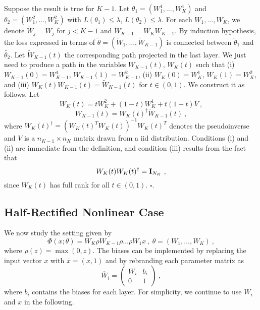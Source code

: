 Suppose the result is true for $K-1$. Let $\theta_1 = (W_1^1, \dots, W^1_K)$ and 
 $\theta_2 = (W_1^2, \dots, W^2_K)$ with $L(\theta_1) \leq \lambda$, $L(\theta_2) \leq \lambda$.
For each $W_1, \dots, W_K$, we denote $\tilde{W}_j = W_j$ for $j < K-1$ and
$\tilde{W}_{K-1} = W_K W_{K-1}$. By induction hypothesis, the 
loss expressed in terms of $\tilde{\theta} = (\tilde{W}_1, \dots, \tilde{W}_{K-1})$ is connected 
between $\tilde{\theta}_1$ and $\tilde{\theta_2}$. Let $\tilde{W}_{K-1}(t)$ the corresponding 
path projected in the last layer. We just need to produce a path in the variables $W_{K-1}(t)$, $W_K(t)$ 
such that (i) $W_{K-1}(0) = W_{K-1}^1$, $W_{K-1}(1) = W_{K-1}^2$, 
(ii) $W_{K}(0) = W_{K}^1$, $W_{K}(1) = W_{K}^2$, and 
(iii) $W_{K}(t) W_{K-1}(t) = \tilde{W}_{K-1}(t)$ for $t \in (0,1)$. 
We construct it as follows. Let 
$$W_{K}(t) = t W_{K}^2 + (1-t) W_{K}^1 + t (1-t) V~,$$
$$W_{K-1}(t) = W_{K}(t)^\dagger \tilde{W}_{K-1}(t)  ~,$$
where $W_{K}(t)^\dagger = ( W_{K}(t)^T W_{K}(t))^{-1} W_{K}(t)^T$ denotes the pseudoinverse 
and $V$ is a $n_{K-1} \times n_{K}$ matrix drawn from a iid distribution. 
Conditions (i) and (ii) are immediate from the definition, and condition (iii) results from the fact that 
$$W_{K}(t) W_{K}(t)^\dagger  = {\bf I}_{N_K}~,$$
since $W_K(t)$ has full rank for all $t \in (0,1)$. 
$\square$.

\subsection{Half-Rectified Nonlinear Case}

We now study the setting given by 
\begin{equation}
\label{relucase}
\Phi(x;\theta) = W_K \rho W_{K-1} \rho \dots \rho W_1 x~,~\theta = (W_1, \dots, W_K)~,
\end{equation}
where $\rho(z) = \max(0 ,z)$. 
The biases can be implemented by replacing the input vector $x$ 
with $\overline{x}=(x, 1)$ and by rebranding each parameter matrix as 
$$\overline{W}_i = \left( 
\begin{array}{c|c}
W_i & b_i \\
\hline 
0 & 1 
\end{array}
\right)~,$$
where $b_i$ contains the biases for each layer.	
For simplicity, we continue to use $W_i$ and $x$ in the following.

